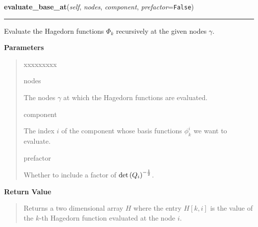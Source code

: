 \hspace{.8\funcindent}\begin{boxedminipage}{\funcwidth}

    \raggedright \textbf{evaluate\_base\_at}(\textit{self}, \textit{nodes}, \textit{component}, \textit{prefactor}={\tt False})

    \vspace{-1.5ex}

    \rule{\textwidth}{0.5\fboxrule}
\setlength{\parskip}{2ex}
    Evaluate the Hagedorn functions $\Phi_k$ recursively
    at the given nodes $\gamma$.

\setlength{\parskip}{1ex}
      \textbf{Parameters}
      \vspace{-1ex}

      \begin{quote}
        \begin{Ventry}{xxxxxxxxx}

          \item[nodes]

          The nodes $\gamma$ at which the Hagedorn
          functions are evaluated.

          \item[component]

          The index $i$ of the component whose basis functions
          $\phi^i_k$ we want to
          evaluate.

          \item[prefactor]

          Whether to include a factor of
          $\det\left( Q_i \right)^{-\frac{1}{2}}$.

        \end{Ventry}

      \end{quote}

      \textbf{Return Value}
    \vspace{-1ex}

      \begin{quote}
      Returns a two dimensional array $H$ where the entry $H[k,i]$ is
      the value of the $k$-th Hagedorn function evaluated at the node
      $i$.

      \end{quote}

    \end{boxedminipage}

    \label{HagedornMultiWavepacket:HagedornMultiWavepacket:evaluate_at}

